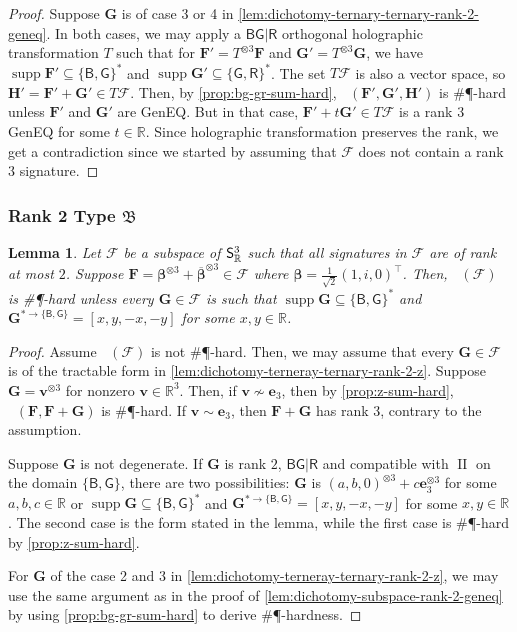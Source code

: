 \documentclass[11pt]{article}
\newtheorem{lemma}[theorem]{Lemma}
\DeclareMathOperator{\holts}{Holant^*_3}
\DeclareMathOperator{\supp}{supp}
\DeclareMathOperator{\typeii}{II}
\newcommand{\db}{\mathsf{B}}
\newcommand{\dg}{\mathsf{G}}
\newcommand{\dr}{\mathsf{R}}
\newcommand{\geneq}{\textsf{GenEQ}\xspace}
\newcommand{\sph}{\#\P-hard\xspace}
\newcommand{\teh}{^{\otimes 3}}
\newcommand{\transpose}{^\intercal}
\newcommand{\domres}[1]{
  ^{*\to\{#1\}}
}
\newcommand{\ternarytractz}{$\mathfrak{B}$\xspace}
\begin{document}
\begin{proof}
  Suppose $\mathbf{G}$ is of case 3 or 4 in \cref{lem:dichotomy-ternary-ternary-rank-2-geneq}.
  In both cases, we may apply a $\db \dg | \dr$ orthogonal holographic transformation $T$ such that for $\mathbf{F}' = T \teh \mathbf{F}$ and $\mathbf{G}' = T \teh \mathbf{G}$, we have $\supp \mathbf{F}' \subseteq \{\db, \dg\}^*$ and $\supp \mathbf{G}' \subseteq \{\dg, \dr\}^*$.
The set $T \mathscr{F}$ is also a vector space, so $\mathbf{H}' = \mathbf{F}' + \mathbf{G}' \in T \mathscr{F}$.
  Then, by \cref{prop:bg-gr-sum-hard}, $\holts(\mathbf{F}', \mathbf{G}', \mathbf{H}')$ is \sph unless $\mathbf{F}'$ and $\mathbf{G}'$ are \geneq.
  But in that case, $\mathbf{F}' + t \mathbf{G}' \in T \mathscr{F}$ is a rank $3$ \geneq for some $t \in \mathbb{R}$.
  Since holographic transformation preserves the rank, we get a contradiction since we started by assuming that $\mathscr{F}$ does not contain a rank $3$ signature.
  \end{proof}

\subsubsection{Rank 2 Type \texorpdfstring{\ternarytractz}{B}}
\begin{lemma}\label{lem:dichotomy-subspace-rank-2-z}
  Let $\mathscr{F}$ be a subspace of $\mathsf{S}^3_{\mathbb{R}}$ such that all signatures in $\mathscr{F}$ are of rank at most $2$.
  Suppose $\mathbf{F} = \boldsymbol{\beta}\teh + \overline{\boldsymbol{\beta}}\teh \in \mathscr{F}$ where $\boldsymbol{\beta} = \frac{1}{\sqrt{2}}(1, i, 0)\transpose$.
  Then, $\holts(\mathscr{F})$ is \sph unless every $\mathbf{G} \in \mathscr{F}$ is such that
  $\supp \mathbf{G} \subseteq \{\db, \dg\}^*$ and $\mathbf{G}\domres{\db, \dg} = [x, y, -x, -y]$ for some $x, y \in \mathbb{R}$.
\end{lemma}
\begin{proof}
Assume $\holts(\mathscr{F})$ is not \sph.
  Then, we may assume that every $\mathbf{G} \in \mathscr{F}$ is of the tractable form in \cref{lem:dichotomy-terneray-ternary-rank-2-z}.
  Suppose $\mathbf{G} = \mathbf{v}\teh$ for nonzero $\mathbf{v} \in \mathbb{R}^3$.
  Then, if $\mathbf{v} \not \sim \mathbf{e}_3$, then by \cref{prop:z-sum-hard}, $\holts(\mathbf{F}, \mathbf{F} + \mathbf{G})$ is \sph.
  If $\mathbf{v} \sim \mathbf{e}_3$, then $\mathbf{F} + \mathbf{G}$ has rank 3, contrary to the assumption.

  Suppose $\mathbf{G}$ is not degenerate.
  If $\mathbf{G}$ is rank $2$, $\db \dg | \dr$ and compatible with $\typeii$ on the domain $\{\db, \dg\}$, there are two possibilities:
  $\mathbf{G}$ is $(a, b, 0)\teh + c \mathbf{e}_3\teh$ for some $a, b, c \in \mathbb{R}$ or $\supp \mathbf{G} \subseteq \{\db, \dg\}^*$ and $\mathbf{G}\domres{\db, \dg} = [x, y, -x, -y]$ for some $x, y \in \mathbb{R}$. 
  The second case is the form stated in the lemma, while the first case is \sph by \cref{prop:z-sum-hard}.

  For $\mathbf{G}$ of the case 2 and 3 in \cref{lem:dichotomy-terneray-ternary-rank-2-z}, we may use the same argument as in the proof of \cref{lem:dichotomy-subspace-rank-2-geneq} by using \cref{prop:bg-gr-sum-hard} to derive \#\P-hardness.
\end{proof}
\end{document}
